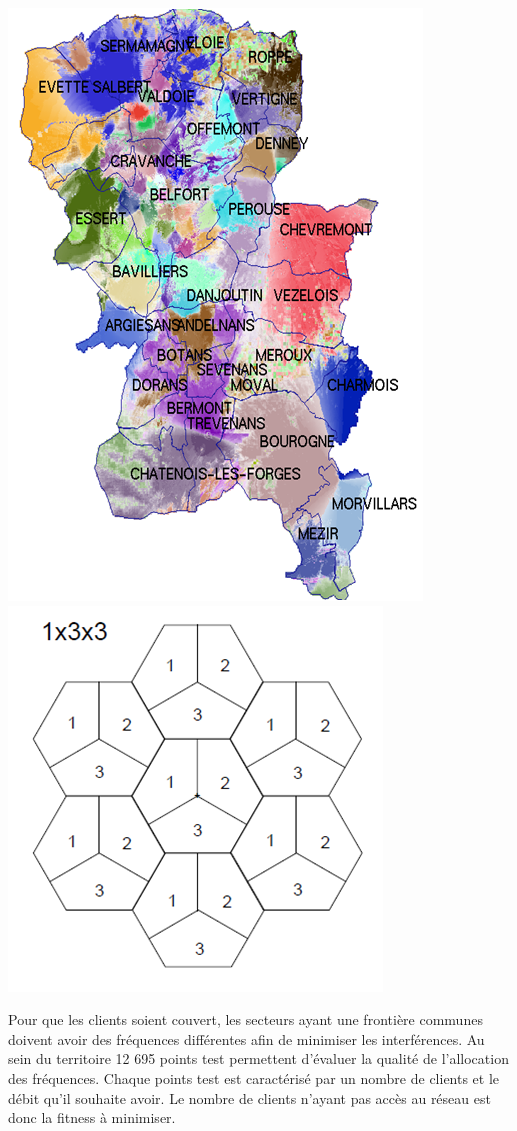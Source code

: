 \documentclass[a4paper, 12pt]{report}
\begin{document}
\begin{center}
	\includegraphics[scale=1]{carte.png} 
	\includegraphics[scale=1]{ruche.png} 
\end{center}

Pour que les clients soient couvert, les secteurs ayant une frontière communes doivent avoir des fréquences différentes afin de minimiser les interférences. Au sein du territoire 12 695 points test permettent d'évaluer la qualité de l'allocation des fréquences. Chaque points test est caractérisé par un nombre de clients et le débit qu'il souhaite avoir. Le nombre de clients n'ayant pas accès au réseau est donc la fitness à minimiser.
\end{document}
